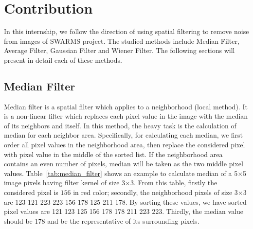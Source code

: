 \chapter{Contribution}
\label{chapter_3}

In this internship, we follow the direction of using spatial filtering to remove noise from images of SWARMS project. The studied methods include  Median Filter, Average Filter, Gaussian Filter and Wiener Filter. The following sections will present in detail each of these methods.

\section{Median Filter}

Median filter is a spatial filter which applies to a neighborhood (local method). It is a non-linear filter which replaces each pixel value in the image with the median of its neighbors and itself. In this method, the heavy task is the calculation of median for each neighbor area. Specifically, for calculating each median, we first order all pixel values in the neighborhood area, then replace the considered pixel with pixel value in the middle of the sorted list. If the neighborhood area contains an even number of pixels, median will be taken as the two middle pixel values. Table~\ref{tab:median_filter} shows an example to calculate median of a 5$\times$5 image pixels having filter kernel of size 3$\times$3. From this table, firstly the considered pixel is $156$ in red color; secondly, the neighborhood pixels of size 3$\times$3 are 123 121 223 223 156 178 125 211 178. By sorting these values, we have sorted pixel values are 121 123 125 156 178 178 211 223 223. Thirdly, the median value should be 178 and be the representative of its surrounding pixels.

